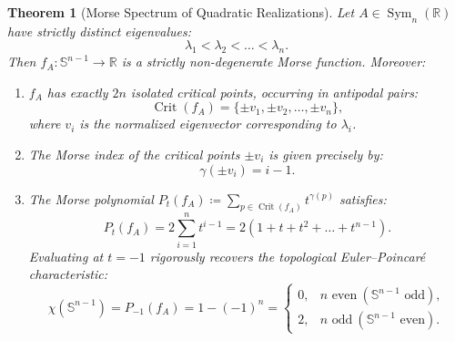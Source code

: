 \documentclass[11pt,a4paper,reqno]{amsart}
\newtheorem{theorem}{Theorem}[section]
\theoremstyle{definition}
\numberwithin{equation}{section}
\providecommand{\R}{\mathbb{R}}
\providecommand{\Sph}{\mathbb{S}}
\providecommand{\Sph}{\mathbb{S}}
\providecommand{\R}{\mathbb{R}}
\begin{document}
\begin{theorem}[Morse Spectrum of Quadratic Realizations]
\label{thm:morse_matrix}
Let $A \in \operatorname{Sym}_n(\R)$ have strictly distinct eigenvalues:
\begin{equation}
    \lambda_1 < \lambda_2 < \dots < \lambda_n.
\end{equation}
Then $f_A \colon \Sph^{n-1} \to \R$ is a strictly non-degenerate Morse function. Moreover:
\begin{enumerate}[label=(\roman*)]
    \item $f_A$ has exactly $2n$ isolated critical points, occurring in antipodal pairs:
    \begin{equation}
        \operatorname{Crit}(f_A) = \{\pm v_1, \pm v_2, \dots, \pm v_n\},
    \end{equation}
    where $v_i$ is the normalized eigenvector corresponding to $\lambda_i$.
    \item The Morse index of the critical points $\pm v_i$ is given precisely by:
    \begin{equation}
        \gamma(\pm v_i) = i - 1.
    \end{equation}
    \item The Morse polynomial $P_t(f_A) \coloneqq \sum_{p \in \operatorname{Crit}(f_A)} t^{\gamma(p)}$ satisfies:
    \begin{equation}
        P_t(f_A) = 2 \sum_{i=1}^n t^{i-1} = 2 (1 + t + t^2 + \dots + t^{n-1}).
    \end{equation}
    Evaluating at $t = -1$ rigorously recovers the topological Euler--Poincar\'e characteristic:
    \begin{equation}
        \chi(\Sph^{n-1}) = P_{-1}(f_A) = 1 - (-1)^n = \begin{cases} 0, & n \text{ even} \ (\Sph^{n-1} \text{ odd}), \\ 2, & n \text{ odd} \ (\Sph^{n-1} \text{ even}). \end{cases}
    \end{equation}
\end{enumerate}
\end{theorem}
\end{document}
